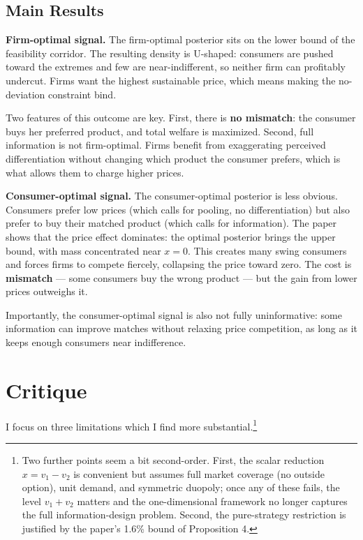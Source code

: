 \documentclass[12pt, a4paper]{article}
\begin{document}
\subsection{Main Results}

\textbf{Firm-optimal signal.} The firm-optimal posterior sits on the lower bound of the feasibility corridor. The resulting density is U-shaped: consumers are pushed toward the extremes and few are near-indifferent, so neither firm can profitably undercut. Firms want the highest sustainable price, which means making the no-deviation constraint bind.

Two features of this outcome are key. First, there is \textbf{no mismatch}: the consumer buys her preferred product, and total welfare is maximized. Second, full information is not firm-optimal. Firms benefit from exaggerating perceived differentiation without changing which product the consumer prefers, which is what allows them to charge higher prices.

\textbf{Consumer-optimal signal.} The consumer-optimal posterior is less obvious. Consumers prefer low prices (which calls for pooling, no differentiation) but also prefer to buy their matched product (which calls for information). The paper shows that the price effect dominates: the optimal posterior brings the upper bound, with mass concentrated near $x = 0$. This creates many swing consumers and forces firms to compete fiercely, collapsing the price toward zero. The cost is \textbf{mismatch} --- some consumers buy the wrong product --- but the gain from lower prices outweighs it.

Importantly, the consumer-optimal signal is also not fully uninformative: some information can improve matches without relaxing price competition, as long as it keeps enough consumers near indifference.

\section{Critique}

I focus on three limitations which I find more substantial.\footnote{Two further points seem a bit second-order. First, the scalar reduction $x = v_1 - v_2$ is convenient but assumes full market coverage (no outside option), unit demand, and symmetric duopoly; once any of these fails, the level $v_1 + v_2$ matters and the one-dimensional framework no longer captures the full information-design problem. Second, the pure-strategy restriction is justified by the paper's 1.6\% bound of Proposition 4.}
\end{document}
